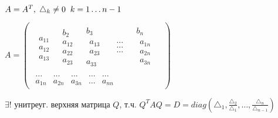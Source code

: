 \documentclass[../main.tex]{subfiles}
\begin{document}
	\begin{theorem}[Якоби]
		$A = A^T, \; \triangle_k \neq 0 \; \; k = 1 \ldots n-1\n$
		\begin{minipage}{0.5\textwidth}
			$A = \begin{pmatrix}
			\begin{matrix}
			\begin{matrix}
			\\ a_{11}\\a_{12}\\a_{13}
			\end{matrix} & \begin{matrix}b_2\\
			\boxed{a_{12}}\\a_{22}\\a_{23}
			\end{matrix} & \begin{matrix}b_3\\\boxed{
				\begin{matrix}
				a_{13}\\a_{23}
				\end{matrix}}\\a_{33}
			\end{matrix} & \begin{matrix}
			\ldots\\\ldots\\\ldots
			\end{matrix} & \begin{matrix}b_n\\\boxed{\begin{matrix}
				a_{1n}\\a_{2n}\\a_{3n}
				\end{matrix}}\end{matrix}
			\end{matrix}\\
			\begin{matrix}
			\ldots & \ldots & \ldots & \ldots & \ldots\\
			a_{1n} & a_{2n} & a_{3n} & \ldots & a_{nn}
			\end{matrix}
			\end{pmatrix}$
		\end{minipage}
		\begin{minipage}{0.5\textwidth}
			$\exists!$ унитреуг. верхняя матрица $Q$, т.ч.\n 
			$Q^T A Q = D = diag(\triangle_1 , \frac{\triangle_2}{\triangle_1}, \ldots, \frac{\triangle_n}{\triangle_{n-1}})$
		\end{minipage}\n 

\end{theorem}
\end{document}
